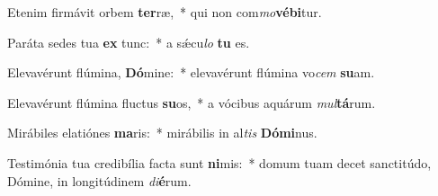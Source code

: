 \item Etenim firmávit orbem \textbf{ter}ræ,~* qui non com\textit{mo}\textbf{vé}\textbf{bi}tur.
\item Paráta sedes tua \textbf{ex} tunc:~* a sǽcu\textit{lo} \textbf{tu} es.
\item Elevavérunt flúmina, \textbf{Dó}mine:~* elevavérunt flúmina vo\textit{cem} \textbf{su}am.
\item Elevavérunt flúmina fluctus \textbf{su}os,~* a vócibus aquárum \textit{mul}\textbf{tá}rum.
\item Mirábiles elatiónes \textbf{ma}ris:~* mirábilis in al\textit{tis} \textbf{Dó}\textbf{mi}nus.
\item Testimónia tua credibília facta sunt \textbf{ni}mis:~* domum tuam decet sanctitúdo, Dómine, in longitúdinem \textit{di}\textbf{é}rum.
